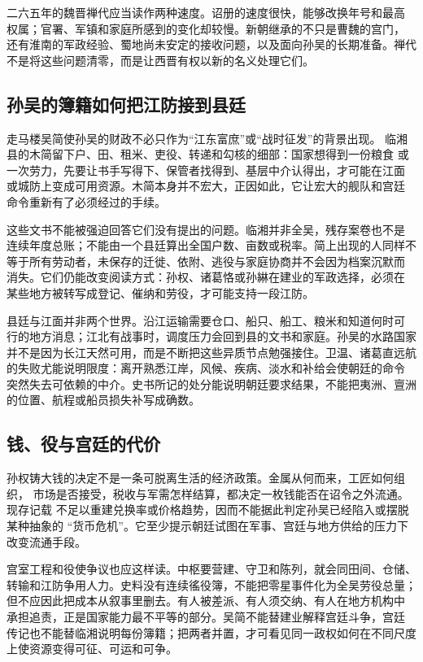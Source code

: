 二六五年的魏晋禅代应当读作两种速度。诏册的速度很快，能够改换年号和最高
权属；官署、军镇和家庭所感到的变化却较慢。新朝继承的不只是曹魏的宫门，
还有淮南的军政经验、蜀地尚未安定的接收问题，以及面向孙吴的长期准备。禅代
不是将这些问题清零，而是让西晋有权以新的名义处理它们。

\subsection{孙吴的簿籍如何把江防接到县廷}

走马楼吴简使孙吴的财政不必只作为“江东富庶”或“战时征发”的背景出现。
临湘县的木简留下户、田、租米、吏役、转递和勾核的细部：国家想得到一份粮食
或一次劳力，先要让书手写得下、保管者找得到、基层中介认得出，才可能在江面
或城防上变成可用资源。木简本身并不宏大，正因如此，它让宏大的舰队和宫廷
命令重新有了必须经过的手续。

这些文书不能被强迫回答它们没有提出的问题。临湘并非全吴，残存案卷也不是
连续年度总账；不能由一个县廷算出全国户数、亩数或税率。简上出现的人同样不
等于所有劳动者，未保存的迁徙、依附、逃役与家庭协商并不会因为档案沉默而
消失。它们仍能改变阅读方式：孙权、诸葛恪或孙綝在建业的军政选择，必须在
某些地方被转写成登记、催纳和劳役，才可能支持一段江防。

县廷与江面并非两个世界。沿江运输需要仓口、船只、船工、粮米和知道何时可
行的地方消息；江北有战事时，调度压力会回到县的文书和家庭。孙吴的水路国家
并不是因为长江天然可用，而是不断把这些异质节点勉强接住。卫温、诸葛直远航
的失败尤能说明限度：离开熟悉江岸，风候、疾病、淡水和补给会使朝廷的命令
突然失去可依赖的中介。史书所记的处分能说明朝廷要求结果，不能把夷洲、亶洲
的位置、航程或船员损失补写成确数。

\subsection{钱、役与宫廷的代价}

孙权铸大钱的决定不是一条可脱离生活的经济政策。金属从何而来，工匠如何组织，
市场是否接受，税收与军需怎样结算，都决定一枚钱能否在诏令之外流通。现存记载
不足以重建兑换率或价格趋势，因而不能据此判定孙吴已经陷入或摆脱某种抽象的
“货币危机”。它至少提示朝廷试图在军事、宫廷与地方供给的压力下改变流通手段。

宫室工程和役使争议也应这样读。中枢要营建、守卫和陈列，就会同田间、仓储、
转输和江防争用人力。史料没有连续徭役簿，不能把零星事件化为全吴劳役总量；
但不应因此把成本从叙事里删去。有人被差派、有人须交纳、有人在地方机构中
承担追责，正是国家能力最不平等的部分。吴简不能替建业解释宫廷斗争，宫廷
传记也不能替临湘说明每份簿籍；把两者并置，才可看见同一政权如何在不同尺度
上使资源变得可征、可运和可争。


